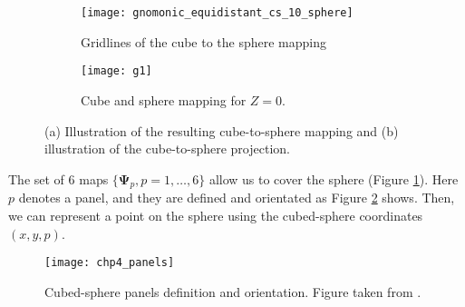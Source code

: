 \begin{figure}[!htb]
	\centering
	\begin{subfigure}{0.42\textwidth}
		\texttt{[image: gnomonic\_equidistant\_cs\_10\_sphere]}
		\caption{Gridlines of the cube to the sphere mapping}
	\end{subfigure}
	\begin{subfigure}{0.42\textwidth}
		\centering
		\texttt{[image: g1]}
		\caption{Cube and sphere mapping for $Z=0$.}
	\end{subfigure}
	\caption{(a) Illustration of the resulting cube-to-sphere mapping and (b) illustration of the cube-to-sphere projection.\label{chp-cs-equidistant}}
\end{figure}
The set of 6 maps $\{\boldsymbol{\Psi}_{p}, p = 1, \ldots, 6\}$ allow us to cover the sphere (Figure \ref{chp-cs-equidistant}).
Here $p$ denotes a panel, and they are defined and orientated as Figure \ref{chp-cs-panels}
shows. Then, we can represent a point on the sphere using the cubed-sphere coordinates
$(x,y,p)$.

\begin{figure}[!htb]
	\centering
	\texttt{[image: chp4\_panels]}
	\caption{Cubed-sphere panels definition and orientation.
    Figure taken from \citet{jung:2019}.\label{chp-cs-panels}}
\end{figure}

